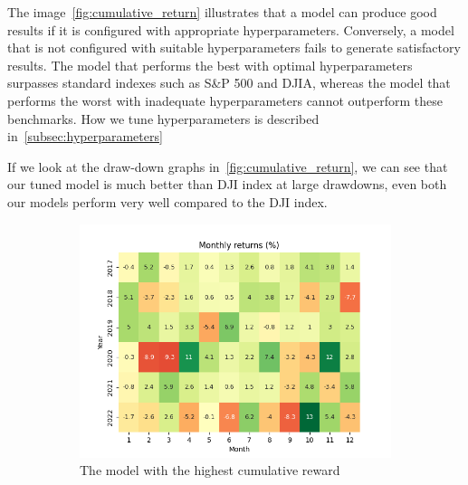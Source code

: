 \documentclass[../xlapes02]{subfiles}
\begin{document}
    The image~\cref{fig:cumulative_return} illustrates that a model can produce good results if it is configured with appropriate hyperparameters. Conversely, a model that is not configured with suitable hyperparameters fails to generate satisfactory results. The model that performs the best with optimal hyperparameters surpasses standard indexes such as S\&P 500 and DJIA, whereas the model that performs the worst with inadequate hyperparameters cannot outperform these benchmarks. How we tune hyperparameters is described in~\cref{subsec:hyperparameters}

    If we look at the draw-down graphs in~\cref{fig:cumulative_return}, we can see that our tuned model is much better than DJI index at large drawdowns, even both our models perform very well compared to the DJI index.


    \begin{figure}[h!]
        \centering
        \begin{subfigure}[t]{\experimentimgwidth\textwidth}
            \centering
            \includegraphics[width=\linewidth]{image/figure/monthly_returns_heatmap_max}
            \caption{The model with the highest cumulative reward}
        \end{subfigure}
        \hfill
        \begin{subfigure}[t]{\experimentimgwidth\textwidth}
            \centering

\end{subfigure}
\end{figure}
\end{document}
